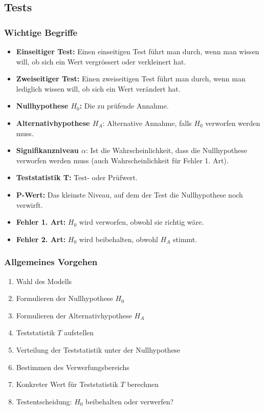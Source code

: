 \documentclass[10pt,a4paper,twocolumn]{article}
\begin{document}
\subsection{Tests}

\subsubsection{Wichtige Begriffe}

\begin{itemize}
\item \textbf{Einseitiger Test:} Einen einseitigen Test führt man durch, wenn man wissen will, ob sich ein Wert vergrössert oder verkleinert hat.
\item \textbf{Zweiseitiger Test:} Einen zweiseitigen Test führt man durch, wenn man lediglich wissen will, ob sich ein Wert verändert hat.
\item \textbf{Nullhypothese $H_0$:} Die zu prüfende Annahme.
\item \textbf{Alternativhypothese $H_A$}: Alternative Annahme, falls $H_0$ verworfen werden muss.
\item \textbf{Signifikanzniveau $\alpha$}: Ist die Wahrscheinlichkeit, dass die Nullhypothese verworfen werden muss (auch Wahrscheinlichkeit für Fehler 1. Art).
\item \textbf{Teststatistik T:} Test- oder Prüfwert.
\item \textbf{P-Wert:} Das kleinste Niveau, auf dem der Test die Nullhypothese noch verwirft.
\item \textbf{Fehler 1. Art:} $H_0$ wird verworfen, obwohl sie richtig wäre.
\item \textbf{Fehler 2. Art:} $H_0$ wird beibehalten, obwohl $H_A$ stimmt.
\end{itemize}

\subsubsection{Allgemeines Vorgehen}
\begin{enumerate}
\item Wahl des Modells
\item Formulieren der Nullhypothese $H_0$
\item Formulieren der Alternativhypothese $H_A$
\item Teststatistik $T$ aufstellen
\item Verteilung der Teststatistik unter der Nullhypothese
\item Bestimmen des Verwerfungsbereichs
\item Konkreter Wert für Teststatistik $T$ berechnen
\item Testentscheidung: $H_0$ beibehalten oder verwerfen?
\end{enumerate}
\end{document}
